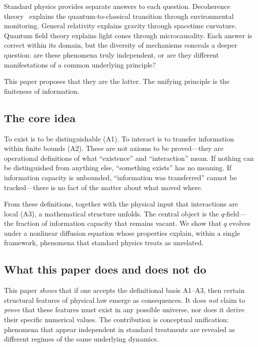 \documentclass[12pt]{article}
\begin{document}
Standard physics provides separate answers to each question. Decoherence theory~\cite{Zurek2003,Schlosshauer2007} explains the quantum-to-classical transition through environmental monitoring. General relativity explains gravity through spacetime curvature. Quantum field theory explains light cones through microcausality. Each answer is correct within its domain, but the diversity of mechanisms conceals a deeper question: are these phenomena truly independent, or are they different manifestations of a common underlying principle?

This paper proposes that they are the latter. The unifying principle is the finiteness of information.

\subsection{The core idea}

To exist is to be distinguishable (A1). To interact is to transfer information within finite bounds (A2). These are not axioms to be proved---they are operational definitions of what ``existence'' and ``interaction'' mean. If nothing can be distinguished from anything else, ``something exists'' has no meaning. If information capacity is unbounded, ``information was transferred'' cannot be tracked---there is no fact of the matter about what moved where.

From these definitions, together with the physical input that interactions are local (A3), a mathematical structure unfolds. The central object is the $q$-field---the fraction of information capacity that remains vacant. We show that $q$ evolves under a nonlinear diffusion equation whose properties explain, within a single framework, phenomena that standard physics treats as unrelated.

\subsection{What this paper does and does not do}

This paper \emph{shows} that if one accepts the definitional basis A1--A3, then certain structural features of physical law emerge as consequences. It does \emph{not} claim to \emph{prove} that these features must exist in any possible universe, nor does it derive their specific numerical values. The contribution is conceptual unification: phenomena that appear independent in standard treatments are revealed as different regimes of the same underlying dynamics.
\end{document}
